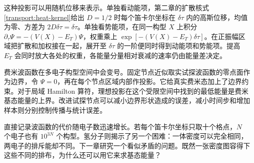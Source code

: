 这种投影可以用随机位移来表示。单独看动能项，第二章的扩散核式\eqref{transport:heat-kernel}给出 $D=1/2$ 时每个笛卡尔坐标在 $\delta\tau$ 内的高斯位移，均值为零、方差为 $2D\delta\tau=\delta\tau$。单独看势能项，在同一构型 $X$ 上积分 $\partial_\tau\Psi=-(V(X)-E_T)\Psi$，权重乘上 $\exp[-(V(X)-E_T)\delta\tau]$。在正振幅区域把扩散和加权接在一起，展开至 $\delta\tau$ 的一阶便同时得到动能项和势能项。提高 $E_T$ 会同时放大各处的权重，各能量分量相对衰减的速率仍由能量差决定。

费米波函数在多电子构型空间中会变号。固定节点近似取实试探波函数的零点面作为边界，令 $\Psi=0$，再在每个节点区域内部作投影。它给真实费米态加上了边界约束。对于局域 Hamilton 算符，理想投影在这个受限空间中找到的最低能量是费米基态能量的上界。改进试探节点可以减小边界形状造成的误差，减小时间步和增加样本则分别控制传播与统计误差。

直接记录波函数的代价随电子数迅速增长。若每个笛卡尔坐标只取十个格点，$N$ 个电子也有 $10^{3N}$ 个构型。氢分子则揭示了另一个困难：一体密度可以完全相同，两电子的排斥能却不同。下一章研究一个看似矛盾的问题。既然一张密度图容得下这些不同的排布，为什么还可以用它来求基态能量？
